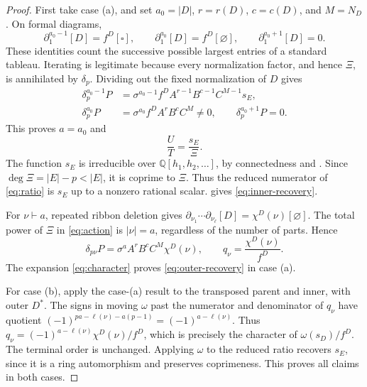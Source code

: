 \documentclass[11pt,a4paper]{amsart}
\numberwithin{equation}{section}
\theoremstyle{plain}
\theoremstyle{definition}
\newcommand{\Q}{\mathbb Q}
\begin{document}
\begin{proof}
First take case (a), and set \(a_0=|D|\), \(r=r(D)\), \(c=c(D)\), and \(M=N_D\).  On formal diagrams,
\begin{equation*}
 \partial_1^{a_0-1}[D]=f^D[\square],\qquad
 \partial_1^{a_0}[D]=f^D[\varnothing],\qquad
 \partial_1^{a_0+1}[D]=0.
\end{equation*}
These identities count the successive possible largest entries of a standard tableau.  Iterating  is legitimate because every normalization factor, and hence \(\Xi\), is annihilated by \(\delta_p\).  Dividing out the fixed normalization of \(D\) gives
\begin{align}
 \delta_p^{a_0-1}P
 &=\sigma^{a_0-1}f^D A^{r-1}B^{c-1}C^{M-1}s_E,
 \label{eq:penultimate}\\
 \delta_p^{a_0}P
 &=\sigma^{a_0}f^D A^rB^cC^M\ne0,
 \qquad \delta_p^{a_0+1}P=0.
 \label{eq:last}
\end{align}
This proves \(a=a_0\) and
\begin{equation}\label{eq:ratio}
 \frac UT=\frac{s_E}{\Xi}.
\end{equation}
The function \(s_E\) is irreducible over \(\Q[h_1,h_2,\ldots]\), by connectedness and \cite[Thm.~1]{Barekat2009CoincidencesCorrigendum}.  Since \(\deg\Xi=|E|-p<|E|\), it is coprime to \(\Xi\).  Thus the reduced numerator of \eqref{eq:ratio} is \(s_E\) up to a nonzero rational scalar.   gives \eqref{eq:inner-recovery}.

For \(\nu\vdash a\), repeated ribbon deletion gives
\(\partial_{\nu_1}\cdots\partial_{\nu_\ell}[D]=\chi^D(\nu)[\varnothing]\).
The total power of \(\Xi\) in \eqref{eq:action} is \(|\nu|=a\), regardless of the number of parts.  Hence
\[
 \delta_{p\nu}P=\sigma^a A^rB^cC^M\chi^D(\nu),
 \qquad q_\nu=\frac{\chi^D(\nu)}{f^D}.
\]
The expansion \eqref{eq:character} proves \eqref{eq:outer-recovery} in case (a).

For case (b), apply the case-(a) result to the transposed parent and inner, with outer \(D^*\).  The signs in moving \(\omega\) past the numerator and denominator of \(q_\nu\) have quotient
\((-1)^{pa-\ell(\nu)-a(p-1)}=(-1)^{a-\ell(\nu)}\).
Thus \(q_\nu=(-1)^{a-\ell(\nu)}\chi^D(\nu)/f^D\), which is precisely the character of \(\omega(s_D)/f^D\).  The terminal order is unchanged.  Applying \(\omega\) to the reduced ratio recovers \(s_E\), since it is a ring automorphism and preserves coprimeness.  This proves all claims in both cases.
\end{proof}
\end{document}
